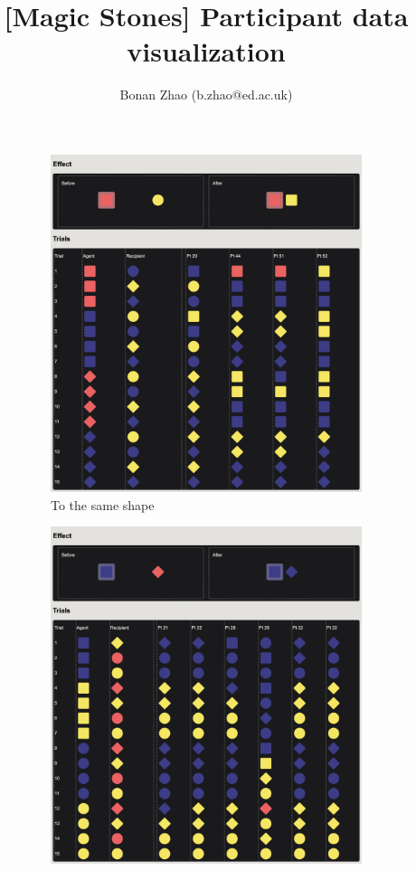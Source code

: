 \documentclass{article}
\title{[Magic Stones] Participant data visualization}
\author{Bonan Zhao (b.zhao@ed.ac.uk)}
\begin{document}
\maketitle


\begin{figure}[b]
	\centering
  \begin{subfigure}[t]{0.31\textwidth}
  	\centering
  	\includegraphics[width=\linewidth]{group01} 
  	\caption{To the same shape} \label{fig:group01}
  \end{subfigure}
  \hfill
  \begin{subfigure}[t]{0.31\textwidth}
  	\centering
  	\includegraphics[width=\linewidth]{group03} 

\end{subfigure}
\end{figure}
\end{document}
